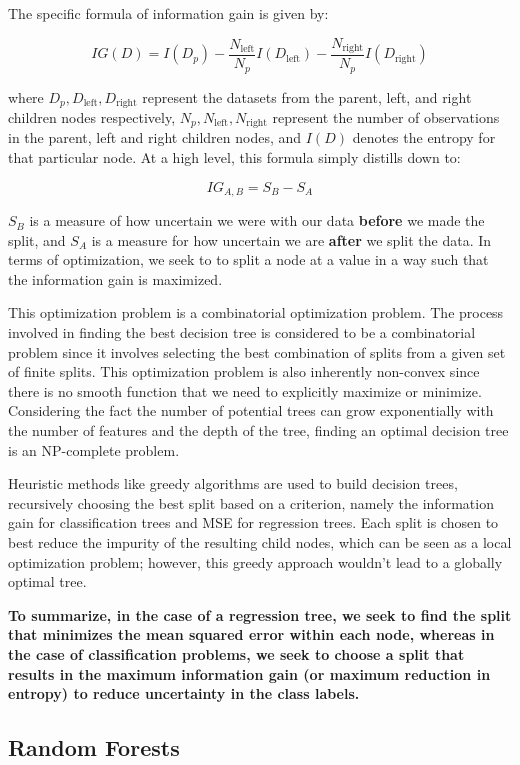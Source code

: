 The specific formula of information gain is given by:

\[
    IG(D) = I(D_p) - \frac{N_{\text{left}}}{N_p}I(D_{\text{left}}) - \frac{N_{\text{right}}}{N_p}I(D_{\text{right}})
\]

where \( D_p, D_{\text{left}}, D_{\text{right}} \) represent the datasets from the parent, left, and right children nodes respectively, \( N_p, N_{\text{left}}, N_{\text{right}} \) represent the number of observations in the parent, left and right children nodes, and \( I(D) \) denotes the entropy for that particular node. At a high level, this formula simply distills down to:

\[
    IG_{A, B} = S_{B} - S_{A}
\]

$S_{B}$ is a measure of how uncertain we were with our data \textbf{before} we made the split, and $S_{A}$ is a measure for how uncertain we are \textbf{after} we split the data. In terms of optimization, we seek to to split a node at a value in a way such that the information gain is maximized.

This optimization problem is a combinatorial optimization problem. The process involved in finding the best decision tree is considered to be a combinatorial problem since it involves selecting the best combination of splits from a given set of finite splits. This optimization problem is also inherently non-convex since there is no smooth function that we need to explicitly maximize or minimize.  Considering the fact the number of potential trees can grow exponentially with the number of features and the depth of the tree, finding an optimal decision tree is an NP-complete problem.

Heuristic methods like greedy algorithms are used to build decision trees, recursively choosing the best split based on a criterion, namely the information gain for classification trees and MSE for regression trees. Each split is chosen to best reduce the impurity of the resulting child nodes, which can be seen as a local optimization problem; however, this greedy approach wouldn't lead to a globally optimal tree.

\textbf{To summarize, in the case of a regression tree, we seek to find the split that minimizes the mean squared error within each node, whereas in the case of classification problems, we seek to choose a split that results in the maximum information gain (or maximum reduction in entropy) to reduce uncertainty in the class labels.}


\subsection{Random Forests} \label{sec:rf}

